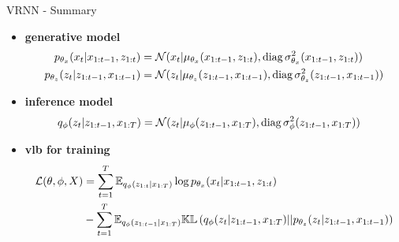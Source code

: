 \begin{frame}{VRNN - Summary}
\begin{tcolorbox}[colback=blue!5!white,colframe=black!75!black,title=Variational RNN]
\begin{itemize}
    \item \textbf{generative model}
    \begin{align}
        \label{gen_model_vrnn}
        p_{\theta_x}(x_t \vert x_{1:t-1}, z_{1:t}) &= \mathcal{N}( x_t \vert \mu_{\theta_x}(x_{1:t-1}, z_{1:t}), \text{diag}\, \sigma_{\theta_x}^2(x_{1:t-1}, z_{1:t})) \\
        p_{\theta_z}(z_t \vert z_{1:t-1}, x_{1:t-1}) &= \mathcal{N}( z_t \vert \mu_{\theta_z}(z_{1:t-1}, x_{1:t-1}), \text{diag}\, \sigma_{\theta_z}^2(z_{1:t-1}, x_{1:t-1}))
    \end{align}
    \item \textbf{inference model}
    \begin{align}
        \label{inf_model_vrnn}
        q_{\phi}(z_{t} \vert z_{1:t-1}, x_{1:T}) &= \mathcal{N}( z_t \vert \mu_{\phi}(z_{1:t-1}, x_{1:T}), \text{diag}\, \sigma_{\phi}^2(z_{1:t-1}, x_{1:T}))
    \end{align}
    \item \textbf{\gls{vlb} for training}
    \begin{align}
        \label{vlb_vrnn}
        \begin{split}
        \mathcal{L}(\theta, \phi, X) &= \sum_{t=1}^T  \mathbb{E}_{q_{\phi}(z_{1:t} \vert x_{1:T})} \log{p_{\theta_x}(x_t \vert x_{1:t-1}, z_{1:t})} \\ &- \sum_{t=1}^T \mathbb{E}_{q_{\phi}(z_{1:t-1} \vert x_{1:T})} \mathbb{KL}\left( q_{\phi}(z_t \vert z_{1:t-1}, x_{1:T}) \vert\vert p_{\theta_z}(z_t \vert z_{1:t-1}, x_{1:t-1}) \right)  \end{split}
    \end{align}
\end{itemize}
\end{tcolorbox}
\end{frame}

